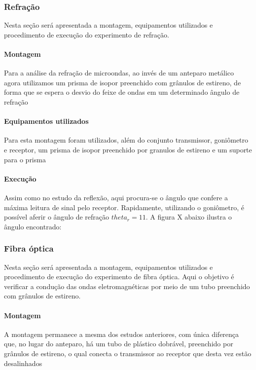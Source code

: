 \documentclass[12pt]{article}
\begin{document}
\subsubsection{Refração}
Nesta seção será apresentada a montagem, equipamentos utilizados e
procedimento de execução do experimento de refração.

\paragraph{Montagem}
Para a análise da refração de microondas, ao invés de um anteparo
metálico agora utilizamos um prisma de isopor preenchido com grânulos
de estireno, de forma que se espera o desvio do feixe de ondas em um
determinado ângulo de refração

\paragraph{Equipamentos utilizados}
Para esta montagem foram utilizados, além do conjunto transmissor,
goniômetro e receptor, um prisma de isopor preenchido por granulos de
estireno e um suporte para o prisma

\paragraph{Execução}
Assim como no estudo da reflexão, aqui procura-se o ângulo que
confere a máxima leitura de sinal pelo receptor. Rapidamente,
utilizando o goniômetro, é possível aferir o ângulo de refração
$theta_r = 11$. A figura X abaixo ilustra o ângulo encontrado:

\subsubsection{Fibra óptica}
Nesta seção será apresentada a montagem, equipamentos utilizados e
procedimento de execução do experimento de fibra óptica. Aqui o
objetivo é verificar a condução das ondas eletromagnéticas por meio
de um tubo preenchido com grânulos de estireno.

\paragraph{Montagem}
A montagem permanece a mesma dos estudos anteriores, com única
diferença que, no lugar do anteparo, há um tubo de plástico dobrável,
preenchido por grânulos de estireno, o qual conecta o transmissor ao
receptor que desta vez estão desalinhados
\end{document}
